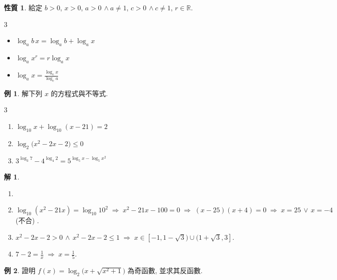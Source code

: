 \documentclass[12pt]{extarticle}
\newcommand{\ds}{\displaystyle}
\newcommand{\ie}{\;\Longrightarrow\;}
\theoremstyle{definition}
\newtheorem*{prp}{性質}
\newtheorem*{ex}{例}
\newtheorem*{sol}{解}
\begin{document}
\begin{prp} 給定 $b > 0$, $x > 0$, $a > 0\,\wedge a\not=1$, $c > 0\,\wedge c\not=1$, $r\in\mathbb{R}$. 
  \setlength{\columnsep}{-0mm}
  \begin{multicols}{3}
    \begin{itemize}\setlength\itemsep{0em}
      \item $\log_a b\,x = \log_a b + \log_a x$
      \item $\ds\log_a x^r = r\log_a x$
      \item $\ds\log_a x = \frac{\log_c x}{\log_c a}$
    \end{itemize}
  \end{multicols}
\end{prp}

\begin{ex} 解下列 $x$ 的方程式與不等式. 
  \setlength{\columnsep}{-0mm}
  \begin{multicols}{3}
    \begin{enumerate}\setlength\itemsep{0em}
      \item $\ds\log_{10} x + \log_{10}(x - 21) = 2$
      \item $\ds\log_2\big(x^2 - 2x - 2\big)\leqslant 0$
      \item $\ds 3^{\log_3 7} - 4^{\log_4 2} = 5^{\log_5 x - \log_5 x^2}$
    \end{enumerate}
  \end{multicols}
\end{ex}

\begin{sol}
  \vspace{-0.5em}
  \begin{enumerate}\setlength\itemsep{0em}
    \item[]
    \item $\ds\log_{10} (x^2 - 21 x) = \log_{10} 10^2 \ie x^2 - 21x - 100 = 0 \ie (x - 25)(x + 4) = 0 \ie x = 25\,\vee\,x = -4$ (不合) . 
    \item $\ds x^2 - 2x - 2 > 0\,\wedge\, x^2 - 2x - 2\leqslant 1 \ie x \in [-1, 1 - \sqrt{3})\cup (1 + \sqrt{3}, 3]$. 
    \item $\ds 7 - 2 = \frac{1}{x} \ie x = \frac{1}{5}$. 
  \end{enumerate}
\end{sol}

\begin{ex}
  證明 $\ds f(x) = \log_2\big(x + \sqrt{x^2 + 1}\big)$ 為奇函數, 並求其反函數. 
\end{ex}
\end{document}
